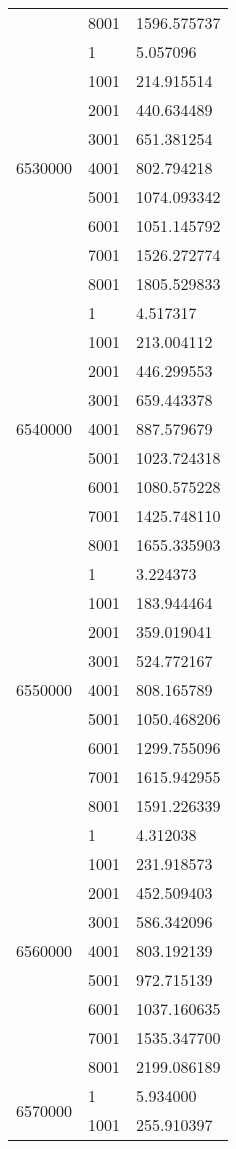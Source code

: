 \begin{table}[htb!]
\begin{tabular}{lll}
 & 8001 & 1596.575737 \\
\multirow[c]{9}{*}{6530000} & 1 & 5.057096 \\
 & 1001 & 214.915514 \\
 & 2001 & 440.634489 \\
 & 3001 & 651.381254 \\
 & 4001 & 802.794218 \\
 & 5001 & 1074.093342 \\
 & 6001 & 1051.145792 \\
 & 7001 & 1526.272774 \\
 & 8001 & 1805.529833 \\
\multirow[c]{9}{*}{6540000} & 1 & 4.517317 \\
 & 1001 & 213.004112 \\
 & 2001 & 446.299553 \\
 & 3001 & 659.443378 \\
 & 4001 & 887.579679 \\
 & 5001 & 1023.724318 \\
 & 6001 & 1080.575228 \\
 & 7001 & 1425.748110 \\
 & 8001 & 1655.335903 \\
\multirow[c]{9}{*}{6550000} & 1 & 3.224373 \\
 & 1001 & 183.944464 \\
 & 2001 & 359.019041 \\
 & 3001 & 524.772167 \\
 & 4001 & 808.165789 \\
 & 5001 & 1050.468206 \\
 & 6001 & 1299.755096 \\
 & 7001 & 1615.942955 \\
 & 8001 & 1591.226339 \\
\multirow[c]{9}{*}{6560000} & 1 & 4.312038 \\
 & 1001 & 231.918573 \\
 & 2001 & 452.509403 \\
 & 3001 & 586.342096 \\
 & 4001 & 803.192139 \\
 & 5001 & 972.715139 \\
 & 6001 & 1037.160635 \\
 & 7001 & 1535.347700 \\
 & 8001 & 2199.086189 \\
\multirow[c]{9}{*}{6570000} & 1 & 5.934000 \\
 & 1001 & 255.910397 \\

\end{tabular}
\end{table}
